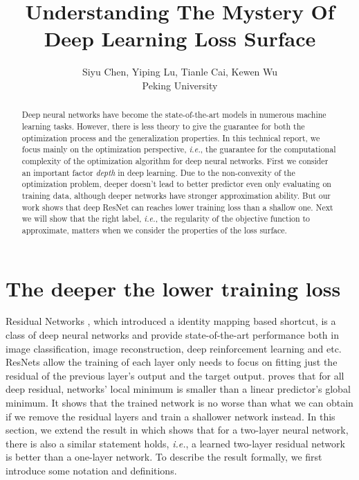 \documentclass{article}
\title{Understanding The Mystery Of Deep Learning Loss Surface}
\author{
    Siyu Chen, Yiping Lu, Tianle Cai, Kewen Wu\\
Peking University
}
\theoremstyle{plain}
\theoremstyle{definition}
\begin{document}

\maketitle

\begin{abstract}
Deep neural networks have become the state-of-the-art
models in numerous machine learning
tasks. However, there is less theory to give the guarantee for both the optimization process and the generalization properties. In this technical report, we focus mainly on the optimization perspective, \emph{i.e.}, the guarantee for the computational complexity of the optimization algorithm for deep neural networks. First we consider an important factor \emph{depth} in deep learning. Due to the non-convexity of the optimization problem, deeper doesn't lead to better predictor even only evaluating on training data, although deeper networks have stronger approximation ability. But our work shows that deep ResNet can reaches lower training loss than a shallow one. Next we will show that the right label, \emph{i.e.}, the regularity of the objective function to approximate, matters when we consider the properties of the loss surface.

\end{abstract}

\section{The deeper the lower training loss}

Residual Networks \cite{he2016deep,he2016identity}, which introduced a identity mapping based shortcut, is a class of deep neural networks and provide state-of-the-art performance both in image classification\cite{he2016deep,he2016identity}, image reconstruction\cite{he2016deep}, deep reinforcement learning\cite{silver2017mastering} and etc. ResNets allow the training of each layer only needs to focus on fitting just the residual of the previous layer’s output and the target output. \cite{2018arXiv180406739S} proves that for all deep residual, networks' local minimum is smaller than a linear predictor's global minimum. It shows that the trained network is no worse than what we can obtain if we remove the
residual layers and train a shallower network instead. In this section, we extend the result in \cite{2018arXiv180406739S} which shows that for a two-layer neural network, there is also a similar statement holds, \emph{i.e.}, a learned two-layer residual network is better than a one-layer network. To describe the result formally, we first introduce some notation and definitions.
\end{document}

